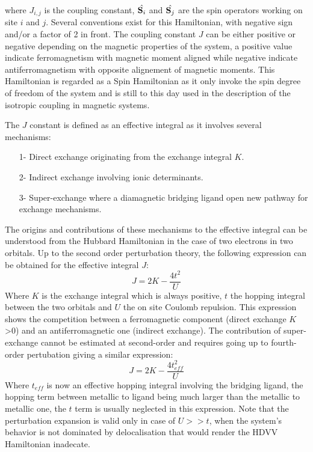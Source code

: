 \documentclass[10pt]{report}
\numberwithin{equation}{section}
\begin{document}
where $J_{i,j}$ is the coupling constant, $\hat{\vb S_i}$ and $\hat{\vb S_j}$ are the spin operators working on site $i$ and $j$.
Several conventions exist for this Hamiltonian, with negative sign and/or a factor of 2 in front.  
The coupling constant $J$ can be either positive or negative depending on the magnetic properties of the system, a positive value indicate ferromagnetism with magnetic moment aligned while negative indicate antiferromagnetism with opposite alignement of magnetic moments.
This Hamiltonian is regarded as a Spin Hamiltonian as it only invoke the spin degree of freedom of the system and is still to this day used in the description of the isotropic coupling in magnetic systems.

The $J$ constant is defined as an effective integral as it involves several mechanisms:
\begin{itemize}
    \item[1-] Direct exchange originating from the exchange integral $K$.
    \item[2-] Indirect exchange involving ionic determinants.
    \item[3-] Super-exchange where a diamagnetic bridging ligand open new pathway for exchange mechanisms.
\end{itemize}

The origins and contributions of these mechanisms to the effective integral can be understood from the Hubbard Hamiltonian in the case of two electrons in two orbitals.
Up to the second order perturbation theory, the following expression can be obtained for the effective integral $J$:
\begin{equation}
    J=2K-\frac{4t^2}{U}
\end{equation}
Where $K$ is the exchange integral which is always positive, $t$ the hopping integral between the two orbitals and $U$ the on site Coulomb repulsion.
This expression shows the competition between a ferromagnetic component (direct exchange $K$>0) and an antiferromagnetic one (indirect exchange).
The contribution of super-exchange cannot be estimated at second-order and requires going up to fourth-order pertubation giving a similar expression:
\begin{equation}
    J=2K-\frac{4t_{eff}^2}{U}
\end{equation}
Where $t_{eff}$ is now an effective hopping integral involving the bridging ligand, the hopping term between metallic to ligand being much larger than the metallic to metallic one, the $t$ term is usually neglected in this expression.
Note that the perturbation expansion is valid only in case of $U>>t$, when the system's behavior is not dominated by delocalisation that would render the HDVV Hamiltonian inadecate.
\end{document}
